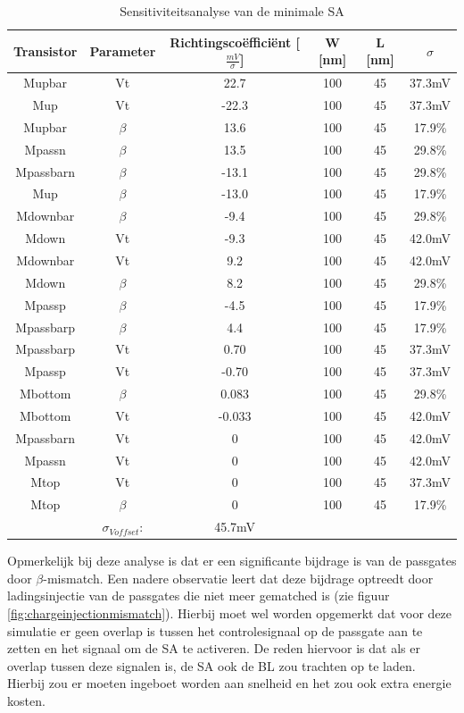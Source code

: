 \begin{table}
\begin{tabular}{cccccc}
\hline 
Transistor & Parameter & Richtingscoëfficiënt [$\frac{mV}{\sigma}$] & W [nm] & L [nm] & $\sigma$ \\ 
\hline 
Mupbar & Vt & 22.7 & 100 & 45 & 37.3mV \\ 
Mup & Vt & -22.3 & 100 & 45 & 37.3mV \\ 
Mupbar & $\beta$ & 13.6 & 100 & 45 & 17.9\% \\ 
Mpassn & $\beta$ & 13.5 & 100 & 45 & 29.8\% \\ 
Mpassbarn & $\beta$ & -13.1 & 100 & 45 & 29.8\% \\ 
Mup & $\beta$ & -13.0 & 100 & 45 & 17.9\% \\ 
Mdownbar & $\beta$ & -9.4 & 100 & 45 & 29.8\% \\ 
Mdown & Vt & -9.3 & 100 & 45 & 42.0mV \\ 
Mdownbar & Vt & 9.2 & 100 & 45 & 42.0mV \\ 
Mdown & $\beta$ & 8.2 & 100 & 45 & 29.8\% \\ 
Mpassp & $\beta$ & -4.5 & 100 & 45 & 17.9\% \\ 
Mpassbarp & $\beta$ & 4.4 & 100 & 45 & 17.9\% \\ 
Mpassbarp & Vt & 0.70 & 100 & 45 & 37.3mV \\ 
Mpassp & Vt & -0.70 & 100 & 45 & 37.3mV \\ 
Mbottom & $\beta$ & 0.083 & 100 & 45 & 29.8\% \\ 
Mbottom & Vt & -0.033 & 100 & 45 & 42.0mV \\ 
Mpassbarn & Vt & 0 & 100 & 45 & 42.0mV \\
Mpassn & Vt & 0 & 100 & 45 & 42.0mV \\
Mtop & Vt & 0 & 100 & 45 & 37.3mV \\
Mtop & $\beta$ & 0 & 100 & 45 & 17.9\% \\
\hline 
\hline & $\sigma_{Voffset}$: & 45.7mV & & & \\
\hline
\end{tabular} 
\caption[Sensitiviteitsanalyse van de minimale SA]{Sensitiviteitsanalyse van de minimale SA}
\label{tab:min-sensanalysis}
\end{table}

Opmerkelijk bij deze analyse is dat er een significante bijdrage is van de passgates door $\beta$-mismatch. Een nadere observatie leert dat deze bijdrage optreedt door ladingsinjectie van de passgates die niet meer gematched is (zie figuur \ref{fig:chargeinjectionmismatch}).
Hierbij moet wel worden opgemerkt dat voor deze simulatie er geen overlap is tussen het controlesignaal op de passgate aan te zetten en het signaal om de SA te activeren.
De reden hiervoor is dat als er overlap tussen deze signalen is, de SA ook de BL zou trachten op te laden. Hierbij zou er moeten ingeboet worden aan snelheid en het zou ook extra energie kosten.

